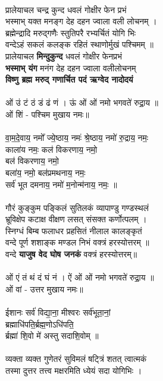 \\
प्रालेयाचल चन्द्र कुन्द धवलं गोक्षीर फेन प्रभं\\
भस्माभ् यक्त मनङ्ग देह दहन ज्वाला वली लोचनम् ।\\
ब्रह्मेन्द्रादि मरुद्गणैः स्तुतिपरै रभ्यर्चितं योगि भिः\\
वन्देऽहं सकलं कलङ्क रहितं स्थाणोर्मुखं पश्चिमम् ॥\\
{\small
प्रालेयाचल \textbf{मिन्दुकुन्द} धवलं गोक्षीर फेनप्रभं\\
\textbf{भस्माभ् यंग} मनंग देह दहन ज्वाला वलीलोचनम्\\
\textbf{विष्णु ब्रह्म मरुद् गणार्चित पदं ऋग्वेद नादोदयं}\\
}
\\
ओं उं टं ठं डं ढं णं । ऊं ओं ओं नमो भगवते॑ रुद्रा॒य ॥\\
ओं  शिं - पश्चिम मुखाय नमः॥\\
\\
वा॒म॒दे॒वाय॒ नमो᳚ ज्ये॒ष्ठाय॒ नमः॑ श्रे॒ष्ठाय॒ नमो॑ रु॒द्राय॒ नमः॒ \\
काला॑य नमः॒ कल॑ विकरणाय॒ नमो॒ \\
बल॑ विकरणाय॒ नमो॒\\
बला॑य॒ नमो॒ बल॑प्रमथनाय॒ नमः॒ \\
सर्व॑ भूत दमनाय॒ नमो॑ म॒नोन्म॑नाय॒ नमः॒ ॥\\
\\
गौरं कुङ्कुम पङ्किलं सुतिलकं व्यापाण्डु गण्डस्थलं\\
भ्रूविक्षेप कटाक्ष वीक्षण लसत् संसक्त कर्णोत्पलम् ।\\
स्निग्धं बिम्ब फलाधर प्रहसितं नीलाल कालङ्कृतं\\
वन्दे पूर्ण शशाङ्क मण्डल निभं वक्त्रं हरस्योत्तरम् ॥\\
{\small
वन्दे \textbf{याजुष वेद घोष जनकं} वक्त्रं हरस्योत्तरम्॥\\
}
\\
ओं एं तं थं दं घं नं । ऐं ओं ओं नमो भगवते॑ रुद्रा॒य ॥\\
ओं वां - उत्तर मुखाय नमः॥\\
\\
ईशानः सर्व॑ विद्या॒ना॒ मीश्वरः सर्व॑भूता॒नां॒\\
ब्रह्माधि॑पति॒र्ब्रह्म॒णोऽधि॑पति॒ \\
र्ब्रह्मा॑ शि॒वो मे॑ अस्तु सदाशि॒वोम् ॥\\
\\
व्यक्ता व्यक्त गुणेतरं सुविमलं षट्त्रिं शतत् त्वात्मकं\\
तस्मा दुत्तर तत्त्व मक्षरमिति ध्येयं सदा योगिभिः ।\\
